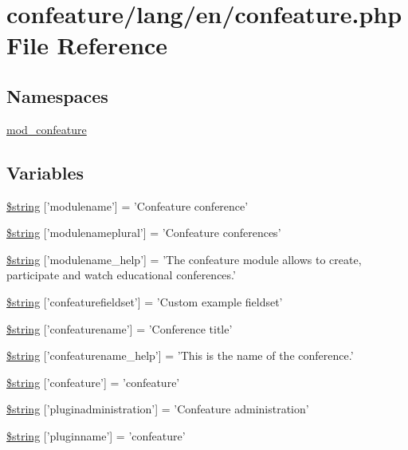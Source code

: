 \hypertarget{confeature_8php}{\section{confeature/lang/en/confeature.php File Reference}
\label{confeature_8php}
}
\subsection*{Namespaces}
\begin{DoxyCompactItemize}
\item 
\hyperlink{namespacemod__confeature}{mod\-\_\-confeature}
\end{DoxyCompactItemize}
\subsection*{Variables}
\begin{DoxyCompactItemize}
\item 
\hyperlink{confeature_8php_a0fd1b50d5c1e8efec916b5698e4ff16d}{\$string} \mbox{[}'modulename'\mbox{]} = 'Confeature conference'
\item 
\hyperlink{confeature_8php_a528f8caa95b6c55ace4d8e34d268a673}{\$string} \mbox{[}'modulenameplural'\mbox{]} = 'Confeature conferences'
\item 
\hyperlink{confeature_8php_af764b57ab092f5233bf21688ed375928}{\$string} \mbox{[}'modulename\-\_\-help'\mbox{]} = 'The confeature module allows to create, participate and watch educational conferences.'
\item 
\hyperlink{confeature_8php_ac0695a4f2f22214e8d8f9783270f6e17}{\$string} \mbox{[}'confeaturefieldset'\mbox{]} = 'Custom example fieldset'
\item 
\hyperlink{confeature_8php_ad96fed1048b9d0a95cda3af0eb174790}{\$string} \mbox{[}'confeaturename'\mbox{]} = 'Conference title'
\item 
\hyperlink{confeature_8php_a8fcec121a1eed415031fe7cc62ee41b3}{\$string} \mbox{[}'confeaturename\-\_\-help'\mbox{]} = 'This is the name of the conference.'
\item 
\hyperlink{confeature_8php_ac89ec52df1912bc34e00fe4e3479a2d1}{\$string} \mbox{[}'confeature'\mbox{]} = 'confeature'
\item 
\hyperlink{confeature_8php_a4652111b33fd71afcd52207b067bbe5c}{\$string} \mbox{[}'pluginadministration'\mbox{]} = 'Confeature administration'
\item 
\hyperlink{confeature_8php_a6ce7ae846f568c162c9d6d051fdc6885}{\$string} \mbox{[}'pluginname'\mbox{]} = 'confeature'
\end{DoxyCompactItemize}


